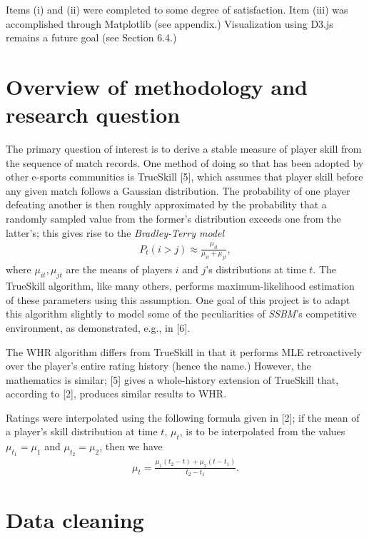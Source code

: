 \documentclass[10pt]{article}
\theoremstyle{definition}
\theoremstyle{remark}
\begin{document}
Items (i) and (ii) were completed to some degree of satisfaction. Item
(iii) was accomplished through Matplotlib (see appendix.) Visualization
using D3.js remains a future goal (see Section 6.4.)

\section{Overview of methodology and research question}
The primary question of interest is to derive a stable measure of player
skill from the sequence of match records. One method of doing so that
has been adopted by other e-sports communities is TrueSkill {[}5{]},
which assumes that player skill before any given match follows a
Gaussian distribution. The probability of one player defeating another
is then roughly approximated by the probability that a randomly sampled
value from the former's distribution exceeds one from the latter's; this
gives rise to the \emph{Bradley-Terry model}
\begin{align*}
    P_t(i > j) \approx \frac{\mu_{it}}{\mu_{it} + \mu_{jt}},
\end{align*}
where $\mu_{it}, \mu_{jt}$ are the means of players $i$ and $j$'s
distributions at time $t$. The TrueSkill algorithm, like many others,
performs maximum-likelihood estimation of these parameters using this
assumption. One goal of this project is to adapt this algorithm slightly
to model some of the peculiarities of \emph{SSBM}'s competitive
environment, as demonstrated, e.g., in {[}6{]}.

The WHR algorithm differs from TrueSkill in that it performs MLE retroactively
over the player's entire rating history (hence the name.) However, the
mathematics is similar; [5] gives a whole-history extension of TrueSkill that,
according to [2], produces similar results to WHR.

Ratings were interpolated using the following formula given in [2]; if the
mean of a player's skill distribution at time $t$, $\mu_t$, is to be interpolated
from the values $\mu_{t_1} = \mu_1$ and $\mu_{t_2} = \mu_2$, then we have
\begin{align*}
    \mu_t = \frac{\mu_1(t_2 - t) + \mu_2(t - t_1)}{t_2 - t_1}.
\end{align*}

\hypertarget{basic-data-model-and-project-workflow}{%
\section{Data cleaning}\label{basic-data-model-and-project-workflow}}
\end{document}
